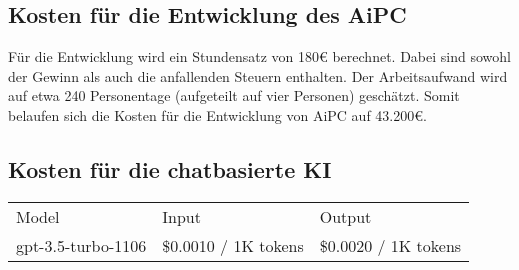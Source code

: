 \subsection{Kosten für die Entwicklung des AiPC}\label{subsec:kosten-für-die-entwicklung-des-aipc}

Für die Entwicklung wird ein Stundensatz von 180€ berechnet. %
Dabei sind sowohl der Gewinn als auch die anfallenden Steuern enthalten.
Der Arbeitsaufwand wird auf etwa 240 Personentage (aufgeteilt auf vier Personen) geschätzt.
Somit belaufen sich die Kosten für die Entwicklung von \ac{AiPC} auf 43.200€.

\subsection{Kosten für die chatbasierte KI}\label{subsec:kosten-für-die-chatbasierte-ki}

\begin{table}[H]
    \begin{tabular}{lll}
    Model              & Input                & Output               \\
    gpt-3.5-turbo-1106 & \$0.0010 / 1K tokens & \$0.0020 / 1K tokens
    \end{tabular}
\end{table}




